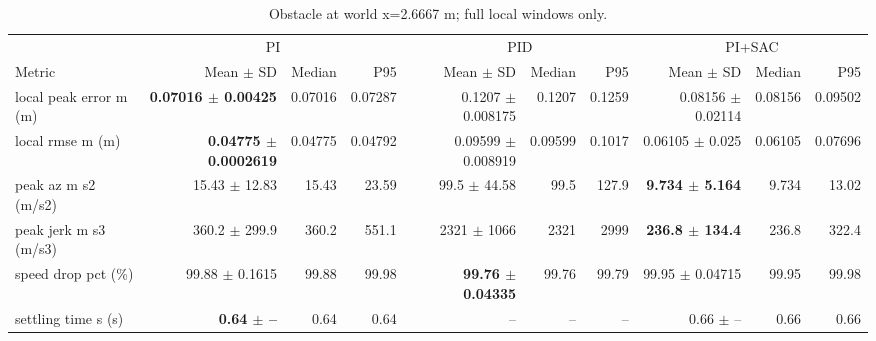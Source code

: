 \begin{table}[t]
\centering
\scriptsize
\caption{Obstacle at world x=2.6667 m; full local windows only.}
\label{tab:obstacle-5}
\begin{tabular}{p{}*{9}{r}}
\toprule
 & \multicolumn{3}{c}{PI} & \multicolumn{3}{c}{PID} & \multicolumn{3}{c}{PI+SAC} \\
\cmidrule(lr){2-4}\cmidrule(lr){5-7}\cmidrule(lr){8-10}
Metric & Mean $\pm$ SD & Median & P95 & Mean $\pm$ SD & Median & P95 & Mean $\pm$ SD & Median & P95 \\
\midrule
local peak error m (m) & \textbf{0.07016 $\pm$ 0.00425} & 0.07016 & 0.07287 & 0.1207 $\pm$ 0.008175 & 0.1207 & 0.1259 & 0.08156 $\pm$ 0.02114 & 0.08156 & 0.09502 \\
local rmse m (m) & \textbf{0.04775 $\pm$ 0.0002619} & 0.04775 & 0.04792 & 0.09599 $\pm$ 0.008919 & 0.09599 & 0.1017 & 0.06105 $\pm$ 0.025 & 0.06105 & 0.07696 \\
peak az m s2 (m/s2) & 15.43 $\pm$ 12.83 & 15.43 & 23.59 & 99.5 $\pm$ 44.58 & 99.5 & 127.9 & \textbf{9.734 $\pm$ 5.164} & 9.734 & 13.02 \\
peak jerk m s3 (m/s3) & 360.2 $\pm$ 299.9 & 360.2 & 551.1 & 2321 $\pm$ 1066 & 2321 & 2999 & \textbf{236.8 $\pm$ 134.4} & 236.8 & 322.4 \\
speed drop pct (\%) & 99.88 $\pm$ 0.1615 & 99.88 & 99.98 & \textbf{99.76 $\pm$ 0.04335} & 99.76 & 99.79 & 99.95 $\pm$ 0.04715 & 99.95 & 99.98 \\
settling time s (s) & \textbf{0.64 $\pm$ --} & 0.64 & 0.64 & -- & -- & -- & 0.66 $\pm$ -- & 0.66 & 0.66 \\
\bottomrule
\end{tabular}
\end{table}
